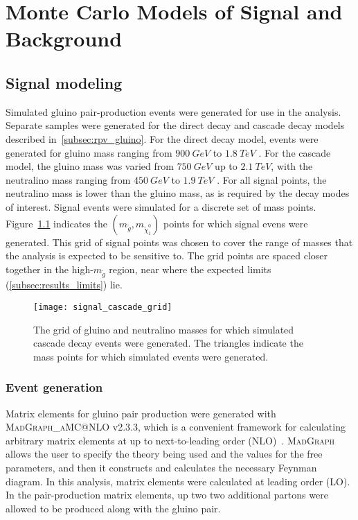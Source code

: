 \chapter{Monte Carlo Models of Signal and Background} \label{ch:monte_carlo}

\section{Signal modeling}\label{sec:signal_modeling}

Simulated gluino pair-production events were generated for use in the analysis.
Separate samples were generated for the direct decay and cascade decay models described in~\ref{subsec:rpv_gluino}.
For the direct decay model, events were generated for gluino mass ranging from $900~GeV$ to $1.8~TeV$ .
For the cascade model, the gluino mass was varied from $750~GeV$ up to $2.1~TeV$, with the neutralino mass ranging from $450~GeV$ to $1.9~TeV$ .
For all signal points, the neutralino mass is lower than the gluino mass, as is required by the decay modes of interest.
Signal events were simulated for a discrete set of mass points.
Figure~\ref{fig:signal_cascade_grid} indicates the $\left(m_{\tilde{g}}, m_{\tilde{\chi}_1^0}\right)$ points for which signal evens were generated.
This grid of signal points was chosen to cover the range of masses that the analysis is expected to be sensitive to.
The grid points are spaced closer together in the high-$m_{\tilde{g}}$ region, near where the expected limits (\ref{subsec:results_limits}) lie.

\begin{figure}[!ht]
    \centering

    \texttt{[image: signal\_cascade\_grid]}

    \caption{The grid of gluino and neutralino masses for which simulated cascade decay events were generated.
    The triangles indicate the mass points for which simulated events were generated.}

    \label{fig:signal_cascade_grid}
\end{figure}

\subsection{Event generation}\label{subsec:signal_event_gen}

Matrix elements for gluino pair production were generated with \textsc{MadGraph\_aMC@NLO} v2.3.3,
which is a convenient framework for calculating arbitrary matrix elements at up to next-to-leading order (NLO)~\cite{signal-madgraph}.
\textsc{MadGraph} allows the user to specify the theory being used and the values for the free parameters,
and then it constructs and calculates the necessary Feynman diagram.
In this analysis, matrix elements were calculated at leading order (LO).
In the pair-production matrix elements, up two two additional partons were allowed to be produced along with the
gluino pair.

